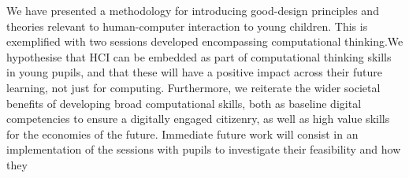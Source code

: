 \documentclass{sig-alternate}
\begin{document}
We have presented a methodology for introducing good-design principles
and theories relevant to human-computer interaction to young
children. This is exemplified with two sessions developed encompassing
computational thinking.We hypothesise that HCI can be embedded as part
of computational thinking skills in young pupils, and that these will
have a positive impact across their future learning, not just for
computing. Furthermore, we reiterate the wider societal benefits of
developing broad computational skills, both as baseline digital
competencies to ensure a digitally engaged citizenry, as well as high
value skills for the economies of the future.  Immediate future work
will consist in an implementation of the sessions with pupils to
investigate their feasibility and how they












\end{document}

